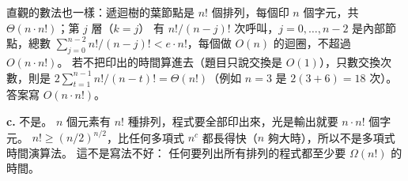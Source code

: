 \begin{pastsoln}
直觀的數法也一樣：遞迴樹的葉節點是 $n!$ 個排列，每個印 $n$ 個字元，共 $\Theta(n \cdot n!)$；第 $j$ 層（$k = j$）
有 $n!/(n-j)!$ 次呼叫，$j = 0, \ldots, n-2$ 是內部節點，總數 $\sum_{j=0}^{n-2} n!/(n-j)! < e \cdot n!$，每個做
$O(n)$ 的迴圈，不超過 $O(n \cdot n!)$。 若不把印出的時間算進去（題目只說交換是 $O(1)$），只數交換次數，則是
$2\sum_{t=1}^{n-1} n!/(n-t)! = \Theta(n!)$（例如 $n = 3$ 是 $2(3 + 6) = 18$ 次）。 答案寫 $O(n \cdot n!)$。

\textbf{c.} 不是。 $n$ 個元素有 $n!$ 種排列，程式要全部印出來，光是輸出就要 $n \cdot n!$ 個字元。
$n! \ge (n/2)^{n/2}$，比任何多項式 $n^c$ 都長得快（$n$ 夠大時），所以不是多項式時間演算法。 這不是寫法不好：
任何要列出所有排列的程式都至少要 $\Omega(n!)$ 的時間。
\end{pastsoln}

